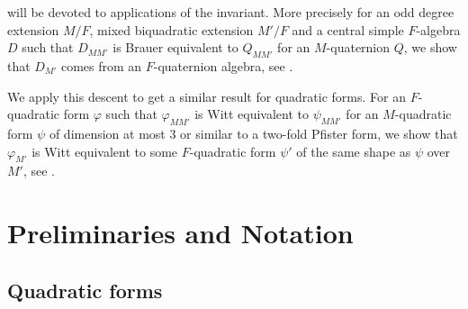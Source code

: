 \documentclass{amsart}
\numberwithin{equation}{section}
\begin{document}
 will be devoted to applications of the invariant. 
More precisely for an odd degree extension $M / F$, mixed biquadratic extension $M' / F$ and a central simple $F$-algebra $D$ such that $D_{MM'}$ is Brauer equivalent to $Q_{MM'}$ for an $M$-quaternion $Q$, we show that $D_{M'}$ comes from an $F$-quaternion algebra, see .

We apply this descent to get a similar result for quadratic forms.
For an $F$-quadratic form $\varphi$ such that $\varphi_{MM'}$ is Witt equivalent to $\psi_{MM'}$ for an $M$-quadratic form $\psi$ of dimension at most 3 or similar to a two-fold Pfister form, we show that $\varphi_{M'}$ is Witt equivalent to some $F$-quadratic form $\psi'$ of the same shape as $\psi$ over $M'$, see .


%
%
%
%
%
%
%
%
%

\section{Preliminaries and Notation}\label{Sec_Preliminaries}

\subsection{Quadratic forms}
\end{document}
